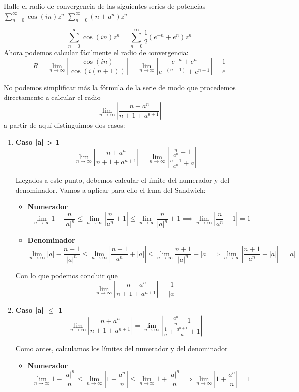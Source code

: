 \begin{problem}[12]
Halle el radio de convergencia de las siguientes series de potencias
\ppart[d] $\sum_{n=0}^{\infty} \cos(in)z^n$
\ppart[f] $\sum_{n=0}^{\infty} (n+a^n)z^n$

\solution

\spart[d]
\[\sum_{n=0}^{\infty} \cos(in)z^n = \sum_{n=0}^{\infty}\frac{1}{2}\left(e^{-n}+e^n \right)z^n\]
Ahora podemos calcular fácilmente el radio de convergencia:
\[R = \lim_{n \to \infty}\left| \frac{\cos(in)}{\cos\left(i(n+1)\right)}\right| = \lim_{n \to \infty}\left| \frac{e^{-n}+e^n}{e^{-(n+1)}+e^{n+1}}\right|=\frac{1}{e}\]

\spart[f]
No podemos simplificar más la fórmula de la serie de modo que procedemos directamente a calcular el radio
\[\lim_{n\to \infty}\left| \frac{n+a^n}{n+1+a^{n+1}}\right|\]
a partir de aquí distinguimos dos casos:
\begin{enumerate}
\item \textbf{ Caso |a| > 1}
\[\lim_{n\to \infty}\left| \frac{n+a^n}{n+1+a^{n+1}}\right| = \lim_{n \to \infty} \left|\frac{\frac{n}{a^n}+1}{\frac{n+1}{a^n}+a} \right| \]

Llegados a este punto, debemos calcular el límite del numerador y del denominador. Vamos a aplicar para ello el lema del Sandwich:
\begin{itemize}
\item \textbf{Numerador}
\[\lim_{n \to \infty} 1-\frac{n}{|a|^n}\leq \lim_{n \to \infty} \left|\frac{n}{a^n}+1 \right| \leq \lim_{n \to \infty} \frac{n}{|a|^n}+1 \implies \lim_{n \to \infty} \left|\frac{n}{a^n}+1 \right|  = 1\]

\item \textbf{Denominador}
\[\lim_{n \to \infty} |a|-\frac{n+1}{|a|^n}\leq \lim_{n \to \infty} \left|\frac{n+1}{a^n}+|a| \right| \leq \lim_{n \to \infty} \frac{n+1}{|a|^n}+|a| \implies \lim_{n \to \infty} \left|\frac{n+1}{a^n}+|a| \right|  = |a|\]
\end{itemize}

Con lo que podemos concluir que
\[\lim_{n\to \infty}\left| \frac{n+a^n}{n+1+a^{n+1}}\right| = \frac{1}{|a|}\]

\item \textbf{Caso |a| $\leq$ 1}
\[\lim_{n\to \infty}\left| \frac{n+a^n}{n+1+a^{n+1}}\right| = \lim_{n \to \infty} \left|\frac{\frac{a^n}{n}+1}{\frac{1}{n}+\frac{a^{n+1}}{n}+1} \right| \]

Como antes, calculamos los límites del numerador y del denominador
\begin{itemize}
\item \textbf{Numerador}
\[\lim_{n\to \infty} 1-\frac{|a|^n}{n} \leq \lim_{n\to \infty}\left| 1+\frac{a^n}{n} \right|  \leq \lim_{n\to \infty}1+\frac{|a|^n}{n} \implies \lim_{n\to \infty} \left| 1+\frac{a^n}{n} \right| = 1\]


\end{itemize}
\end{enumerate}
\end{problem}
